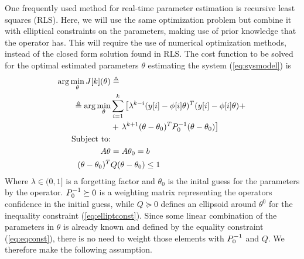 
One frequently used method for real-time parameter estimation is recursive least squares
(RLS)\cite{astrom_adaptive_2008}. Here, we will use the same optimization problem but
combine it with elliptical constraints on the parameters, making use of prior knowledge
that the operator has. This will require the use of numerical optimization methods, instead 
of the closed form solution found in RLS. The cost function to be solved for the optimal
estimated parameters $\theta$ estimating the system (\ref{eq:sysmodel}) is
\begin{align}
        \arg\min\limits_{\theta} J[k](\theta) &\triangleq \notag
        \\ \triangleq \arg\min\limits_{\theta} &
            \sum\limits_{i=1}^k \left[
            \lambda^{k-i}(y[i]-\phi[i]\theta)^T(y[i]-\phi[i]\theta) + \right. \notag \\
            &+ \left. \lambda^{k+1}(\theta-\theta_0)^TP_0^{-1}(\theta-\theta_0) \right]
    \label{eq:costfunction} \\
    \text{Subject to:}& \notag \\
    A\theta &= A\theta_0 = b
    \label{eq:eqconst} \\
    (\theta-\theta_0)^T&Q(\theta-\theta_0) \leq 1
    \label{eq:elliptconst}
\end{align}
Where $\lambda \in (0,1]$ is a forgetting factor and $\theta_0$
is the inital guess for the parameters
by the operator. $P_0^{-1} \succeq 0$ is a weighting matrix representing the
operators confidence in the initial guess, while $Q \succeq 0$ defines an
ellipsoid around $\theta^0$ for the
inequality constraint (\ref{eq:elliptconst}). Since some linear combination
of the parameters in $\theta$ is already known and defined by the equality constraint
(\ref{eq:eqconst}), there is no need to weight those elements with $P_0^{-1}$ and $Q$. We therefore
make the following assumption.


